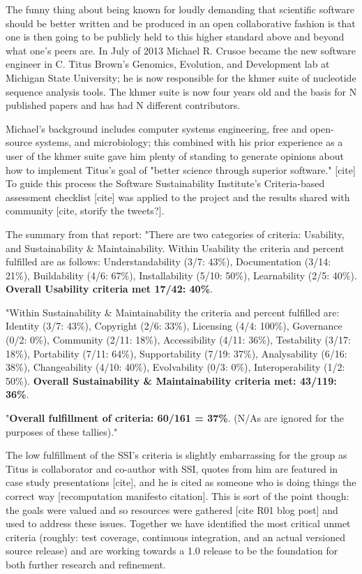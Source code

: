 \documentclass{article}
\begin{document}
The funny thing about being known for loudly demanding that scientific software
should be better written and be produced in an open collaborative fashion is
that one is then going to be publicly held to this higher standard above and
beyond what one's peers are. In July of 2013 Michael R. Crusoe became the new
software engineer in C. Titus Brown's Genomics, Evolution, and Development lab
at Michigan State University; he is now responsible for the khmer suite of
nucleotide sequence analysis tools. The khmer suite is now four years old and
the basis for N published papers and has had N different contributors. 

Michael's background includes computer systems engineering, free and
open-source systems, and microbiology; this combined with his prior experience
as a user of the khmer suite gave him plenty of standing to generate opinions
about how to implement Titus's goal of "better science through superior
software." [cite] To guide this process the Software Sustainability Institute's
Criteria-based assessment checklist [cite] was applied to the project and the
results shared with community [cite, storify the tweets?].

The summary from that report: "There are two categories of criteria: Usability, and
Sustainability \& Maintainability. Within Usability the criteria and percent
fulfilled are as follows: Understandability (3/7: 43\%), Documentation (3/14:
21\%), Buildability (4/6: 67\%), Installability (5/10: 50\%), Learnability (2/5:
40\%). \textbf{Overall Usability criteria met 17/42: 40\%}.

"Within Sustainability \& Maintainability the criteria and percent fulfilled are:
Identity (3/7: 43\%), Copyright (2/6: 33\%), Licensing (4/4: 100\%), Governance
(0/2: 0\%), Community (2/11: 18\%), Accessibility (4/11: 36\%), Testability (3/17:
18\%), Portability (7/11: 64\%), Supportability (7/19: 37\%), Analysability (6/16:
38\%), Changeability (4/10: 40\%), Evolvability (0/3: 0\%), Interoperability (1/2:
50\%). \textbf{Overall Sustainability \& Maintainability criteria met: 43/119:
36\%}.

"\textbf{Overall fulfillment of criteria: 60/161 = 37\%}. (N/As are ignored for the
purposes of these tallies)."

The low fulfillment of the SSI's criteria is slightly embarrassing for the group
as Titus is collaborator and co-author with SSI, quotes from him are featured
in case study presentations [cite], and he is cited as someone who is doing
things the correct way [recomputation manifesto citation]. This is sort of the
point though: the goals were valued and so resources were gathered [cite R01
blog post] and used to address these issues. Together we have identified the
most critical unmet criteria (roughly: test coverage, continuous integration, and an
actual versioned source release) and are working towards a 1.0 release to be the
foundation for both further research and refinement.
\end{document}
